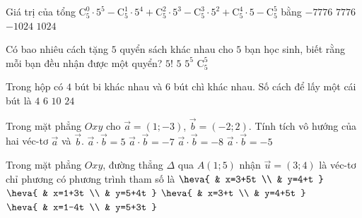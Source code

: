 \begin{ex}%
	Giá trị của tổng $\mathrm{C}_5^0 \cdot 5^5-\mathrm{C}_5^1 \cdot 5^4+\mathrm{C}_5^2 \cdot 5^3-\mathrm{C}_5^3 \cdot 5^2+\mathrm{C}_5^4 \cdot 5-\mathrm{C}_5^5$ bằng 
	\choice
	{$-7776$}
	{$7776$}
	{$-1024$}
	{\True $1024$}
\end{ex}
\begin{ex}%
	Có bao nhiêu cách tặng  $5$  quyển sách khác nhau cho  $5$  bạn học sinh, biết rằng mỗi bạn đều nhận được một quyển? 
	\choice
	{\True $5!$}
	{$5$}
	{$5^5$}
	{$\mathrm{C}_5^5$}
\end{ex}
\begin{ex}%
	Trong hộp có  $4$  bút bi khác nhau và  $6$  bút chì khác nhau. Số cách để lấy một cái bút là 
	\choice
	{$4$}
	{$6$}
	{\True $10$}
	{$24$}
\end{ex}
\begin{ex}%
	Trong mặt phẳng $Oxy$ cho $\overrightarrow{a}=(1;-3)$, $\overrightarrow{b}=(-2;2)$. Tính tích vô hướng của hai véc-tơ $\overrightarrow{a}$ và $\overrightarrow{b}$. 
	\choice
	{$\overrightarrow{a} \cdot \overrightarrow{b}=5$}
	{$\overrightarrow{a} \cdot \overrightarrow{b}=-7$}
	{\True $\overrightarrow{a} \cdot \overrightarrow{b}=-8$}
	{$\overrightarrow{a} \cdot \overrightarrow{b}=-5$}
\end{ex}
\begin{ex}%
	Trong mặt phẳng $Oxy$, đường thẳng $\Delta$ qua $A(1;5)$ nhận $\overrightarrow{u}=(3;4)$ là véc-tơ chỉ phương có phương trình tham số là 
	\choice
	{$\heva{
			& x=3+5t \\
			& y=4+t }$}
	{\True $\heva{
			& x=1+3t \\
			& y=5+4t }$}
	{$\heva{
			& x=3+t \\
			& y=4+5t }$}
	{$\heva{
			& x=1-4t \\
			& y=5+3t }$}
\end{ex}
